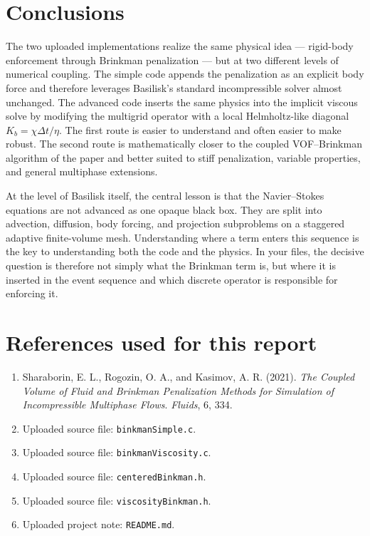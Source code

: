 \documentclass[11pt,a4paper]{article}
\begin{document}
\section{Conclusions}

The two uploaded implementations realize the same physical idea --- rigid-body enforcement through Brinkman penalization --- but at two different levels of numerical coupling. The simple code appends the penalization as an explicit body force and therefore leverages Basilisk's standard incompressible solver almost unchanged. The advanced code inserts the same physics into the implicit viscous solve by modifying the multigrid operator with a local Helmholtz-like diagonal $K_b=\chi\Delta t/\eta$. The first route is easier to understand and often easier to make robust. The second route is mathematically closer to the coupled VOF--Brinkman algorithm of the paper and better suited to stiff penalization, variable properties, and general multiphase extensions.

At the level of Basilisk itself, the central lesson is that the Navier--Stokes equations are not advanced as one opaque black box. They are split into advection, diffusion, body forcing, and projection subproblems on a staggered adaptive finite-volume mesh. Understanding where a term enters this sequence is the key to understanding both the code and the physics. In your files, the decisive question is therefore not simply what the Brinkman term is, but where it is inserted in the event sequence and which discrete operator is responsible for enforcing it.

\section{References used for this report}

\begin{enumerate}[leftmargin=1.8em]
\item Sharaborin, E. L., Rogozin, O. A., and Kasimov, A. R. (2021). \emph{The Coupled Volume of Fluid and Brinkman Penalization Methods for Simulation of Incompressible Multiphase Flows}. \emph{Fluids}, 6, 334.
\item Uploaded source file: \texttt{binkmanSimple.c}.
\item Uploaded source file: \texttt{binkmanViscosity.c}.
\item Uploaded source file: \texttt{centeredBinkman.h}.
\item Uploaded source file: \texttt{viscosityBinkman.h}.
\item Uploaded project note: \texttt{README.md}.
\end{enumerate}
\end{document}
